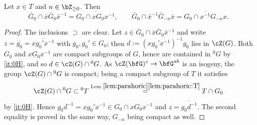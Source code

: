 \documentclass[12pt,a4paper]{amsart}%
\begin{document}
\begin{lemma}\label{lem:center}
Let $x\in T$ and $n\in \Z_{\geq 0}$. Then
$$\bar G_0\cap \bar x\bar G_0\bar x^{-1}=\overline{G_0\cap xG_0x^{-1}},\qquad
\bar G_0\cap \bar x^{-1}\bar G_{-n}\bar x=\overline{G_0\cap x^{-1}G_{-n}x}.$$
\end{lemma}
\begin{proof}
The inclusions $\supset$ are clear. Let $z\in \bar G_0\cap \bar x\bar G_0\bar x^{-1}$ and write $z=\overline{g_0}=\overline{xg_0'x^{-1}}$ with $g_0,g_0'\in G_0$; then $d:=(xg_0'x^{-1})^{-1}g_0$ lies in $\cZ(G)$. Both $G_0$ and $xG_0x^{-1}$ are compact subgroups of $G$, hence are contained in ${}^0G$ by \eqref{it:0H}, and so $d\in \cZ(G)\cap{}^0G$. As $\cZ(\bfG)^\circ\to \bfG^{ab}$ is an isogeny, the group $\cZ(G)\cap{}^0G$ is compact; being a compact subgroup of $T$ it satisfies
$$\cZ(G)\cap{}^0G\subset {}^0T\overset{\text{Lem }\ref{lem:parahoric}\eqref{lem:parahoric:T}}{=}T\cap G_0$$
by \eqref{it:0H}. Hence $g_0d^{-1}=xg_0'x^{-1}\in G_0\cap xG_0x^{-1}$ and $z=\overline{g_0d^{-1}}$. The second equality is proved in the same way, $G_{-n}$ being compact as well.
\end{proof}
\end{document}
